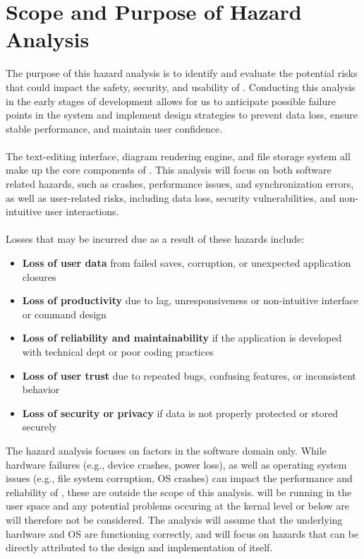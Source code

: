 \documentclass{article}
\begin{document}
\section{Scope and Purpose of Hazard Analysis}

The purpose of this hazard analysis is to identify and evaluate the potential 
risks that could impact the safety, security, and usability of \progname. 
Conducting this analysis in the early stages of development allows for us to 
anticipate possible failure points in the system and implement design strategies
to prevent data loss, ensure stable performance, and maintain user confidence.
\\
\\
The text-editing interface, diagram rendering engine, and file storage system all 
make up the core components of \progname. This analysis will focus on both 
software related hazards, such as crashes, performance issues, and 
synchronization errors, as well as user-related risks, including data loss, 
security vulnerabilities, and non-intuitive user interactions.
\\
\\
Losses that may be incurred due as a result of these hazards include:
\begin{itemize}
    \item \textbf{Loss of user data} from failed saves, corruption, or unexpected
    application closures
    \item \textbf{Loss of productivity} due to lag, unresponsiveness or
    non-intuitive interface or command design
    \item \textbf{Loss of reliability and maintainability} if the application 
    is developed with technical dept or poor coding practices
    \item \textbf{Loss of user trust} due to repeated bugs, confusing features,
    or inconsistent behavior
    \item \textbf{Loss of security or privacy} if data is not properly protected
    or stored securely
\end{itemize}

The hazard analysis focuses on factors in the software domain only. While
hardware failures (e.g., device crashes, power loss), as well as operating
system issues (e.g., file system corruption, OS crashes) can impact the
performance and reliability of \progname, these are outside the scope of this
analysis. \progname will be running in the user space and any potential
problems occuring at the kernal level or below are will therefore not be 
considered. The analysis will assume that the underlying hardware and OS
are functioning correctly, and will focus on hazards that can be directly
attributed to the design and implementation of \progname itself.
\end{document}
